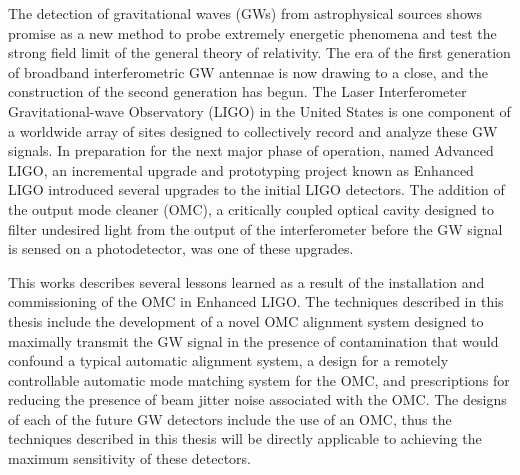 % 
% 
%

The detection of gravitational waves (GWs) from astrophysical sources shows promise as a new method to probe extremely energetic phenomena and test the strong field limit of the general theory of relativity. %
The era of the first generation of broadband interferometric GW antennae is now drawing to a close, and the construction of the second generation has begun. %
The Laser Interferometer Gravitational-wave Observatory (LIGO) in the United States is one component of a worldwide array of sites designed to collectively record and analyze these GW signals. %
In preparation for the next major phase of operation, named Advanced LIGO, an incremental upgrade and prototyping project known as Enhanced LIGO introduced several upgrades to the initial LIGO detectors. %
The addition of the output mode cleaner (OMC), a critically coupled optical cavity designed to filter undesired light from the output of the interferometer before the GW signal is sensed on a photodetector, was one of these upgrades.

This works describes several lessons learned as a result of the installation and commissioning of the OMC in Enhanced LIGO. %
The techniques described in this thesis include the development of a novel OMC alignment system designed to maximally transmit the GW signal in the presence of contamination that would confound a typical automatic alignment system, a design for a remotely controllable automatic mode matching system for the OMC, and prescriptions for reducing the presence of beam jitter noise associated with the OMC. %
The designs of each of the future GW detectors include the use of an OMC, thus the techniques described in this thesis will be directly applicable to achieving the maximum sensitivity of these detectors.
